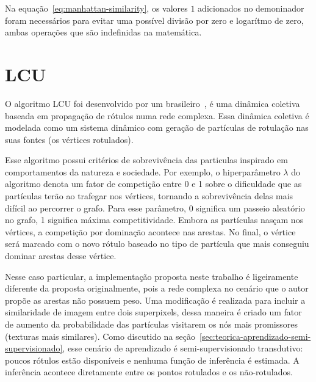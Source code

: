 Na equação~\ref{eq:manhattan-similarity}, os valores $1$ adicionados
no demoninador foram necessários para evitar uma possível divisão por
zero e logarítmo de zero, ambas operações que são indefinidas na
matemática.


\section{LCU}\label{sec:teorica-lcu}

O algoritmo \gls{LCU} foi desenvolvido por um
brasileiro~\cite{VerriNetworkUnfoldingMap2018}, é uma dinâmica
coletiva baseada em propagação de rótulos numa rede complexa. Essa
dinâmica coletiva é modelada como um sistema dinâmico com geração de
partículas de rotulação nas suas fontes (os vértices rotulados).

Esse algoritmo possui critérios de sobrevivência das particulas
inspirado em comportamentos da natureza e sociedade. Por exemplo, o
hiperparâmetro $ \lambda $ do algoritmo denota um fator de competição entre
0 e 1 sobre o dificuldade que as partículas terão ao trafegar nos
vértices, tornando a sobrevivência delas mais difícil ao percorrer o
grafo. Para esse parâmetro, 0 significa um passeio aleatório no grafo,
1 significa máxima competitividade. Embora as partículas nasçam nos
vértices, a competição por dominação acontece nas arestas. No final, o
vértice será marcado com o novo rótulo baseado no tipo de partícula
que mais conseguiu dominar arestas desse vértice.

Nesse caso particular, a implementação proposta neste trabalho é
ligeiramente diferente da proposta originalmente, pois a rede complexa
no cenário que o autor propõe as arestas não possuem peso. Uma
modificação é realizada para incluir a similaridade de imagem entre
dois superpixels, dessa maneira é criado um fator de aumento da
probabilidade das partículas visitarem os nós mais promissores
(texturas mais similares). Como discutido na
seção~\ref{sec:teorica-aprendizado-semi-supervisionado}, esse cenário
de aprendizado é semi-supervisionado transdutivo: poucos rótulos estão
disponíveis e nenhuma função de inferência é estimada. A inferência
acontece diretamente entre os pontos rotulados e os não-rotulados.


